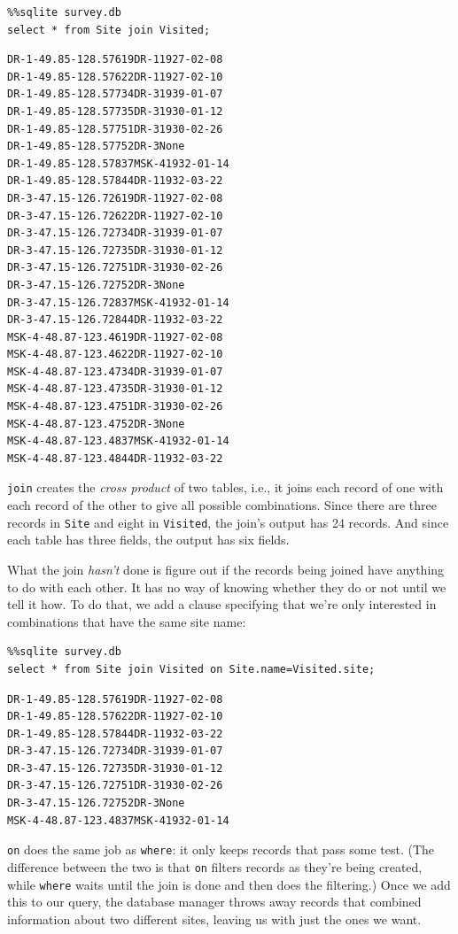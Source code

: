 \documentclass[]{book}
\newcommand{\gdef}[2]{\emph{#2}}
\begin{document}
\begin{verbatim}
%%sqlite survey.db
select * from Site join Visited;
\end{verbatim}

\begin{verbatim}
DR-1-49.85-128.57619DR-11927-02-08
DR-1-49.85-128.57622DR-11927-02-10
DR-1-49.85-128.57734DR-31939-01-07
DR-1-49.85-128.57735DR-31930-01-12
DR-1-49.85-128.57751DR-31930-02-26
DR-1-49.85-128.57752DR-3None
DR-1-49.85-128.57837MSK-41932-01-14
DR-1-49.85-128.57844DR-11932-03-22
DR-3-47.15-126.72619DR-11927-02-08
DR-3-47.15-126.72622DR-11927-02-10
DR-3-47.15-126.72734DR-31939-01-07
DR-3-47.15-126.72735DR-31930-01-12
DR-3-47.15-126.72751DR-31930-02-26
DR-3-47.15-126.72752DR-3None
DR-3-47.15-126.72837MSK-41932-01-14
DR-3-47.15-126.72844DR-11932-03-22
MSK-4-48.87-123.4619DR-11927-02-08
MSK-4-48.87-123.4622DR-11927-02-10
MSK-4-48.87-123.4734DR-31939-01-07
MSK-4-48.87-123.4735DR-31930-01-12
MSK-4-48.87-123.4751DR-31930-02-26
MSK-4-48.87-123.4752DR-3None
MSK-4-48.87-123.4837MSK-41932-01-14
MSK-4-48.87-123.4844DR-11932-03-22
\end{verbatim}

\texttt{join} creates the \gdef{g:cross-product}{cross product} of
two tables, i.e., it joins each record of one with each record of the
other to give all possible combinations. Since there are three records
in \texttt{Site} and eight in \texttt{Visited}, the join's output has 24
records. And since each table has three fields, the output has six
fields.

What the join \emph{hasn't} done is figure out if the records being
joined have anything to do with each other. It has no way of knowing
whether they do or not until we tell it how. To do that, we add a clause
specifying that we're only interested in combinations that have the same
site name:

\begin{verbatim}
%%sqlite survey.db
select * from Site join Visited on Site.name=Visited.site;
\end{verbatim}

\begin{verbatim}
DR-1-49.85-128.57619DR-11927-02-08
DR-1-49.85-128.57622DR-11927-02-10
DR-1-49.85-128.57844DR-11932-03-22
DR-3-47.15-126.72734DR-31939-01-07
DR-3-47.15-126.72735DR-31930-01-12
DR-3-47.15-126.72751DR-31930-02-26
DR-3-47.15-126.72752DR-3None
MSK-4-48.87-123.4837MSK-41932-01-14
\end{verbatim}

\texttt{on} does the same job as \texttt{where}: it only keeps records
that pass some test. (The difference between the two is that \texttt{on}
filters records as they're being created, while \texttt{where} waits
until the join is done and then does the filtering.) Once we add this to
our query, the database manager throws away records that combined
information about two different sites, leaving us with just the ones we
want.
\end{document}
